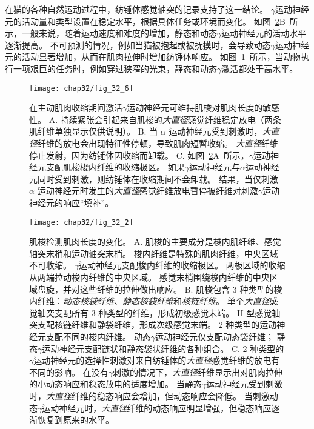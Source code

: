 在猫的各种自然运动过程中，纺锤体感觉轴突的记录支持了这一结论。
$ \gamma $运动神经元的活动量和类型设置在稳定水平，根据具体任务或环境而变化。
如图~\ref{fig:32_2}B~所示，一般来说，随着运动速度和难度的增加，静态和动态$ \gamma $运动神经元的活动水平逐渐提高。
不可预测的情况，例如当猫被抱起或被抚摸时，会导致动态$ \gamma $运动神经元的活动显著增加，从而在肌肉拉伸时增加纺锤体响应。 
如图~\ref{fig:32_6}~所示，当动物执行一项艰巨的任务时，例如穿过狭窄的光束，静态和动态$ \gamma $激活都处于高水平。


\begin{figure}[htbp]
	\centering
	\texttt{[image: chap32/fig\_32\_6]}
	\caption{在主动肌肉收缩期间激活$ \gamma $运动神经元可维持肌梭对肌肉长度的敏感性\cite{hunt1951stretch}。 
	A. 持续紧张会引起来自肌梭的\textit{大直径}感觉纤维稳定放电（两条肌纤维单独显示仅供说明）。
	B. 当 $ \alpha $ 运动神经元受到刺激时，\textit{大直径}纤维的放电会出现特征性停顿，导致肌肉短暂收缩。
	\textit{大直径}纤维停止发射，因为纺锤体因收缩而卸载。
	C. 如图~\ref{fig:32_2}A~所示，$ \gamma $运动神经元支配肌梭梭内纤维的收缩极区。
	如果$ \gamma $运动神经元与$ \alpha $运动神经元同时受到刺激，则纺锤体在收缩期间不会卸载。
	结果，当仅刺激 $ \alpha $ 运动神经元时发生的\textit{大直径}感觉纤维放电暂停被纤维对刺激$ \gamma $运动神经元的响应“填补”。}
	\label{fig:32_6}
\end{figure}


\begin{figure}[htbp]
	\centering
	\texttt{[image: chap32/fig\_32\_2]}
	\caption{肌梭检测肌肉长度的变化。
	A. 肌梭的主要成分是梭内肌纤维、感觉轴突末梢和运动轴突末梢。
	梭内纤维是特殊的肌肉纤维，中央区域不可收缩。
	$ \gamma $运动神经元支配梭内纤维的收缩极区。
	两极区域的收缩从两端拉动梭内纤维的中央区域。
	感觉末梢围绕梭内纤维的中央区域盘旋，并对这些纤维的拉伸做出响应\cite{hulliger1984mammalian}。
	B. 肌梭包含 3 种类型的梭内纤维：\textit{动态核袋纤维}、\textit{静态核袋纤维}和\textit{核链纤维}。
	单个\textit{大直径}感觉轴突支配所有 3 种类型的纤维，形成初级感觉末端。
	II 型感觉轴突支配核链纤维和静袋纤维，形成次级感觉末端。
	2 种类型的运动神经元支配不同的梭内纤维。
	动态$ \gamma $运动神经元仅支配动态袋纤维；
	静态$ \gamma $运动神经元支配链状和静态袋状纤维的各种组合\cite{boyd1980isolated}。
	C. 2 种类型的$ \gamma $运动神经元的选择性刺激对来自纺锤体的\textit{大直径}感觉纤维的放电有不同的影响。
	在没有$ \gamma $刺激的情况下，\textit{大直径}纤维显示出对肌肉拉伸的小动态响应和稳态放电的适度增加。
	当静态$ \gamma $运动神经元受到刺激时，\textit{大直径}纤维的稳态响应会增加，但动态响应会降低。
	当刺激动态$\gamma$运动神经元时，\textit{大直径}纤维的动态响应明显增强，但稳态响应逐渐恢复到原来的水平\cite{brown1966subdivision}。}
	\label{fig:32_2}
\end{figure}


